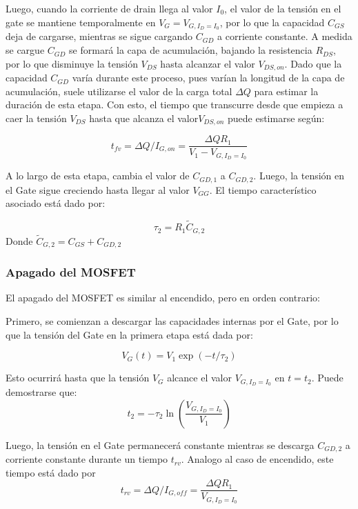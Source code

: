 \documentclass[e4_tp1_main.tex]{subfiles}
\begin{document}
Luego, cuando la corriente de drain llega al valor $I_0$, el valor de la tensión en el gate se mantiene temporalmente en $V_G=V_{G,I_D=I_0}$, por lo que la capacidad $C_{GS}$ deja de cargarse, mientras se sigue cargando $C_{GD}$ a corriente constante. A medida se cargue $C_{GD}$ se formará la capa de acumulación, bajando la resistencia $R_{DS}$, por lo que disminuye la tensión $V_{DS}$ hasta alcanzar el valor $V_{DS,on}$. Dado que la capacidad $C_{GD}$ varía durante este proceso, pues varían la longitud de la capa de acumulación, suele utilizarse el valor de la carga total $\Delta Q$ para estimar la duración de esta etapa. Con esto, el tiempo que transcurre desde que empieza a caer la tensión $V_{DS}$ hasta que alcanza el valor$V_{DS,on}$ puede estimarse según:

\begin{equation}
t_{fv} = \Delta Q/I_{G,on} = \frac{\Delta Q R_1}{V_{1}-V_{G,I_D=I_0}}
\end{equation}

A lo largo de esta etapa, cambia el valor de $C_{GD,1}$ a $C_{GD,2}$. Luego, la tensión en el Gate sigue creciendo hasta llegar al valor $V_{GG}$. El tiempo característico asociado está dado por:

\begin{equation}
\tau_2 = R_1\tilde{C}_{G,2}
\end{equation}
Donde $\tilde{C}_{G,2} = C_{GS} + C_{GD,2}$

\subsubsection{Apagado del MOSFET}

El apagado del MOSFET es similar al encendido, pero en orden contrario:

Primero, se comienzan a descargar las capacidades internas por el Gate, por lo que la tensión del Gate en la primera etapa está dada por:

\begin{equation}
V_G(t) = V_{1} \exp(-t/\tau_2)
\end{equation}

Esto ocurrirá hasta que la tensión $V_G$ alcance el valor $V_{G,I_D=I_0}$ en $t=t_2$. Puede demostrarse que:
\begin{equation}
t_2= -\tau_2\ln\left(\frac{V_{G,I_D=I_0}}{V_1}\right)
\end{equation}

Luego, la tensión en el Gate permanecerá constante mientras se descarga $C_{GD,2}$ a corriente constante durante un tiempo $t_{rv}$. Analogo al caso de encendido, este tiempo está dado por
\begin{equation}
t_{rv} = \Delta Q/I_{G,off} = \frac{\Delta Q R_1}{V_{G,I_D=I_0}}
\end{equation}
\end{document}
